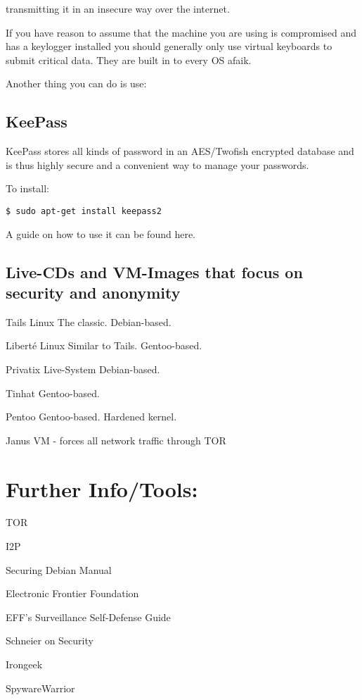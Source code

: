 \documentclass{article}
\begin{document}
transmitting it in an insecure way over the internet. 


 If you have reason to assume that the machine you are using is compromised and has a keylogger installed you should generally only use virtual keyboards to submit critical data. They are built in to every OS afaik.


 Another thing you can do is use: 
\subsection{KeePass}


 KeePass stores all kinds of password in an AES/Twofish encrypted database and is thus highly secure and a convenient way to manage your passwords.


 To install:
\begin{lstlisting}
$ sudo apt-get install keepass2
\end{lstlisting}



 A guide on how to use it can be found here.
\subsection{Live-CDs and VM-Images that focus on security and anonymity}


 Tails Linux The classic. Debian-based.


 Liberté Linux Similar to Tails. Gentoo-based.


 Privatix Live-System Debian-based.


 Tinhat Gentoo-based.


 Pentoo Gentoo-based. Hardened kernel.


 Janus VM - forces all network traffic through TOR




\section{Further Info/Tools:}


 TOR

I2P

Securing Debian Manual

Electronic Frontier Foundation

EFF's Surveillance Self-Defense Guide

Schneier on Security

Irongeek

SpywareWarrior
\end{document}
